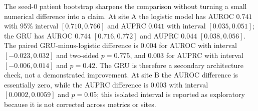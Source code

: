 \begin{table}[tb]
\centering
\caption{Three-seed score discrimination (mean $\pm$ sample standard deviation). AUPRC is computed over usable pre-onset timesteps; positive-timestep prevalence is 1.27\% at A and 0.72\% at B. Ten-bin ECE is reported in the text for all three models and is descriptive.}
\label{tab:discrimination}
\small
{}
\end{table}

The seed-0 patient bootstrap sharpens the comparison without turning a small numerical difference into a claim. At site A the logistic model has AUROC $0.741$ with 95\% interval $[0.710,0.766]$ and AUPRC $0.041$ with interval $[0.035,0.051]$; the GRU has AUROC $0.744$ $[0.716,0.772]$ and AUPRC $0.044$ $[0.038,0.056]$. The paired GRU-minus-logistic difference is $0.004$ for AUROC with interval $[-0.023,0.032]$ and two-sided $p=0.775$, and $0.003$ for AUPRC with interval $[-0.006,0.014]$ and $p=0.42$. The GRU is therefore a secondary architecture check, not a demonstrated improvement. At site B the AUROC difference is essentially zero, while the AUPRC difference is $0.003$ with interval $[0.0002,0.0059]$ and $p=0.05$; this isolated interval is reported as exploratory because it is not corrected across metrics or sites.
